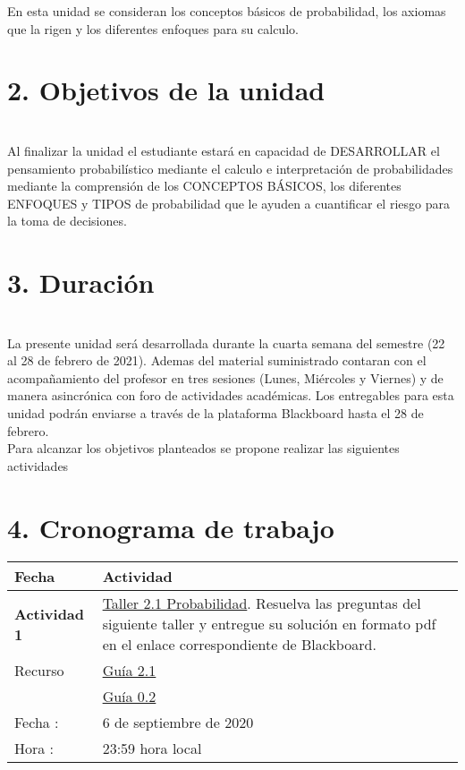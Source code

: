 \documentclass[base=hide,12pt]{elegantbook}
\begin{document}
En esta unidad se consideran los conceptos básicos de probabilidad, los axiomas que la rigen y los diferentes enfoques para su calculo.

\section*{2. Objetivos de la unidad}\\

Al finalizar la  unidad el estudiante estará en capacidad de DESARROLLAR el pensamiento probabilístico mediante el calculo e interpretación de probabilidades mediante la  comprensión de los CONCEPTOS BÁSICOS, los diferentes ENFOQUES y TIPOS de probabilidad  que le ayuden a cuantificar el riesgo para la toma de decisiones.\\


\section*{3. Duración}\\

La presente  unidad será desarrollada durante la  cuarta semana del semestre (22 al 28 de febrero de 2021). Ademas del material suministrado  contaran con el acompañamiento del profesor en tres sesiones (Lunes, Miércoles y Viernes) y de manera asincrónica con  foro de actividades académicas. Los entregables para esta unidad podrán enviarse a través de la plataforma Blackboard hasta el  28 de febrero.\\

Para alcanzar los objetivos planteados se propone realizar las siguientes actividades

\section*{4. Cronograma de trabajo}


\begin{tabular}{p{4cm}p{10cm}}
	\hline	
	Fecha                   & Actividad	\\
	\hline 	
	{\bf Actividad 1}       & \href{https://javerianacaliedu-my.sharepoint.com/:b:/g/personal/dgonzalez_javerianacali_edu_co/ETPgO49hSddLhEWo-xVAIwkBEoucX7_gRzQjVd-90E6iGw?e=v6gGJd}{Taller 2.1 Probabilidad}.  Resuelva las preguntas del siguiente  taller y entregue su solución  en formato pdf  en el enlace correspondiente de Blackboard.  \\
	
	Recurso                 & \href{https://javerianacaliedu-my.sharepoint.com/:b:/g/personal/dgonzalez_javerianacali_edu_co/EZW566KCy4JEteDOachNsZMBi_BRXzyHQzlis0ox3z5FIw?e=7CgZE7}{Guía 2.1}\\	
	& \href{https://javerianacaliedu-my.sharepoint.com/:b:/g/personal/dgonzalez_javerianacali_edu_co/EWyklcI3XH9Dk8ECZo-V5JsBA4EkbDyLMtow3ZxFl_3LwA?e=9XhGWC}{Guía 0.2}
	
                        & \\
Fecha  :                & 6 de septiembre de 2020\\
Hora   :                & 23:59 hora local \\
\hline 
\end{tabular}	
\end{document}
